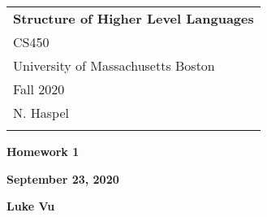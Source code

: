 \documentclass[a4paper,12pt]{article}
\begin{document}
	\thispagestyle{empty}
	
	\begin{tabular}{p{15.5cm}}
		{\large \bf Structure of Higher Level Languages} \\ CS450 \\
		University of Massachusetts Boston \\ Fall 2020  \\ N. Haspel\\
		\hline
		\\
	\end{tabular}

	\vspace*{0.1cm}
	
	\begin{center}
		{\Large \bf Homework 1}
		\vspace{1mm}
		
		{\bf September 23, 2020}
		\vspace{1mm}
		
		{\bf Luke Vu}	
	\end{center} 

	\vspace*{0.5cm}
	
\end{document}

